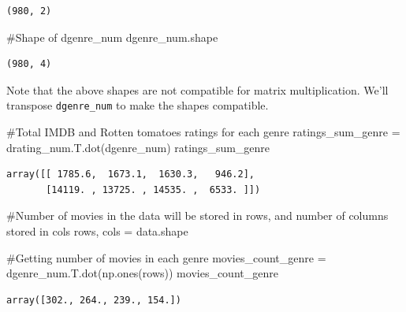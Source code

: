 \documentclass[
  letterpaper,
  DIV=11,
  numbers=noendperiod]{scrreprt}
\newenvironment{Shaded}{\begin{snugshade}}{\end{snugshade}}
\newcommand{\CommentTok}[1]{\textcolor[rgb]{0.37,0.37,0.37}{#1}}
\newcommand{\NormalTok}[1]{\textcolor[rgb]{0.00,0.23,0.31}{#1}}
\newcommand{\OperatorTok}[1]{\textcolor[rgb]{0.37,0.37,0.37}{#1}}
\begin{document}
\begin{verbatim}
(980, 2)
\end{verbatim}

\begin{Shaded}
\begin{Highlighting}[]
\CommentTok{\#Shape of dgenre\_num}
\NormalTok{dgenre\_num.shape}
\end{Highlighting}
\end{Shaded}

\begin{verbatim}
(980, 4)
\end{verbatim}

Note that the above shapes are not compatible for matrix multiplication.
We'll transpose \texttt{dgenre\_num} to make the shapes compatible.

\begin{Shaded}
\begin{Highlighting}[]
\CommentTok{\#Total IMDB and Rotten tomatoes ratings for each genre}
\NormalTok{ratings\_sum\_genre }\OperatorTok{=}\NormalTok{ drating\_num.T.dot(dgenre\_num)}
\NormalTok{ratings\_sum\_genre}
\end{Highlighting}
\end{Shaded}

\begin{verbatim}
array([[ 1785.6,  1673.1,  1630.3,   946.2],
       [14119. , 13725. , 14535. ,  6533. ]])
\end{verbatim}

\begin{Shaded}
\begin{Highlighting}[]
\CommentTok{\#Number of movies in the data will be stored in \textquotesingle{}rows\textquotesingle{}, and number of columns stored in \textquotesingle{}cols\textquotesingle{}}
\NormalTok{rows, cols }\OperatorTok{=}\NormalTok{ data.shape}
\end{Highlighting}
\end{Shaded}

\begin{Shaded}
\begin{Highlighting}[]
\CommentTok{\#Getting number of movies in each genre}
\NormalTok{movies\_count\_genre }\OperatorTok{=}\NormalTok{ dgenre\_num.T.dot(np.ones(rows))}
\NormalTok{movies\_count\_genre}
\end{Highlighting}
\end{Shaded}

\begin{verbatim}
array([302., 264., 239., 154.])
\end{verbatim}
\end{document}
